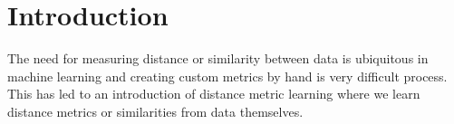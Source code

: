 \documentclass[12pt,a4paper]{report}
\begin{document}



\tableofcontents







%
%
%
%
%
%

\chapter{Introduction} \label{introduction}

The need for measuring distance or similarity between data is ubiquitous in machine learning and creating custom metrics by hand is very difficult process. This has led to an introduction of distance metric learning where we learn distance metrics or similarities from data themselves.
\end{document}
